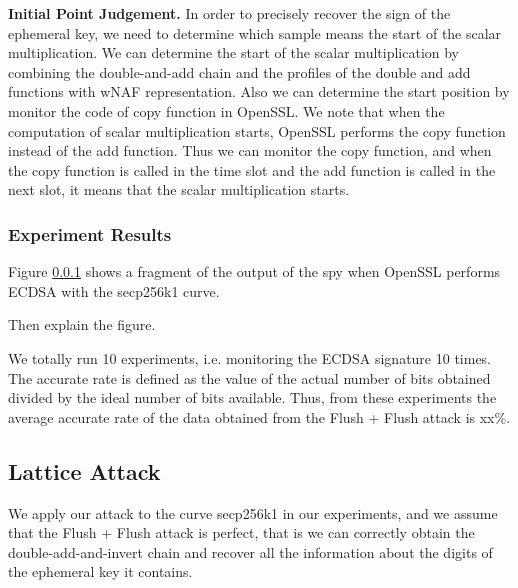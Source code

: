 \noindent\textbf{Initial Point Judgement.}
In order to precisely recover the sign of the ephemeral key, we need to determine which sample means the start of the scalar multiplication.
We can determine the
start of the scalar multiplication
by combining the double-and-add chain and the profiles of the double and add functions with wNAF representation.
Also we can determine the start position by monitor the code of copy function in OpenSSL.
 We note that when the computation of scalar multiplication starts, OpenSSL performs the copy function instead of the add function.
 Thus we can monitor the copy function, and when the copy function is called in the time slot and the add function is called in the next slot, it means that the scalar multiplication starts.


\subsubsection{Experiment Results}
Figure \ref{} shows a fragment of the output of the spy when OpenSSL performs ECDSA with the secp256k1 curve.

Then explain the figure.

We totally run 10 experiments, i.e. monitoring the ECDSA signature 10 times.
The accurate rate is defined as the value of the actual number of bits obtained divided by the ideal number of bits available.
Thus, from these experiments the average accurate rate of the data obtained from the Flush + Flush attack is xx\%.



%
%
%
%
%


\subsection{Lattice Attack}
\label{latticeattack}
We apply our attack to the curve secp256k1 in our experiments, and we assume that the Flush + Flush attack is perfect, that is we can correctly obtain the double-add-and-invert chain and recover all the information about the digits of the ephemeral key it contains.

